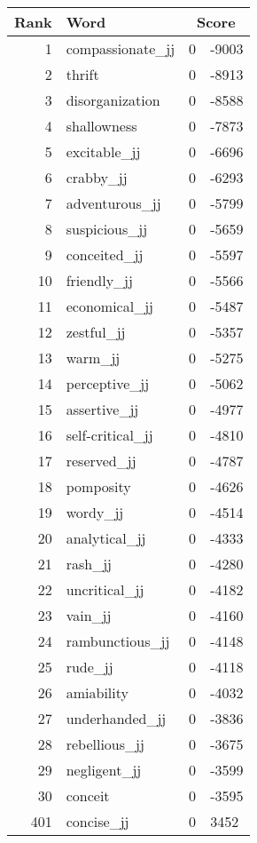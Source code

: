 \begin{longtable}[!htbp]{| rlr@{.}l |}
    \hline
    \textbf{Rank} & \textbf{Word} & \multicolumn{2}{c|}{\textbf{Score}} \\
    \hline
    \endhead
    1 & compassionate\_jj & 0 & -9003 \\
    2 & thrift & 0 & -8913 \\
    3 & disorganization & 0 & -8588 \\
    4 & shallowness & 0 & -7873 \\
    5 & excitable\_jj & 0 & -6696 \\
    6 & crabby\_jj & 0 & -6293 \\
    7 & adventurous\_jj & 0 & -5799 \\
    8 & suspicious\_jj & 0 & -5659 \\
    9 & conceited\_jj & 0 & -5597 \\
    10 & friendly\_jj & 0 & -5566 \\
    11 & economical\_jj & 0 & -5487 \\
    12 & zestful\_jj & 0 & -5357 \\
    13 & warm\_jj & 0 & -5275 \\
    14 & perceptive\_jj & 0 & -5062 \\
    15 & assertive\_jj & 0 & -4977 \\
    16 & self-critical\_jj & 0 & -4810 \\
    17 & reserved\_jj & 0 & -4787 \\
    18 & pomposity & 0 & -4626 \\
    19 & wordy\_jj & 0 & -4514 \\
    20 & analytical\_jj & 0 & -4333 \\
    21 & rash\_jj & 0 & -4280 \\
    22 & uncritical\_jj & 0 & -4182 \\
    23 & vain\_jj & 0 & -4160 \\
    24 & rambunctious\_jj & 0 & -4148 \\
    25 & rude\_jj & 0 & -4118 \\
    26 & amiability & 0 & -4032 \\
    27 & underhanded\_jj & 0 & -3836 \\
    28 & rebellious\_jj & 0 & -3675 \\
    29 & negligent\_jj & 0 & -3599 \\
    30 & conceit & 0 & -3595 \\
    401 & concise\_jj & 0 & 3452 \\

\end{longtable}
